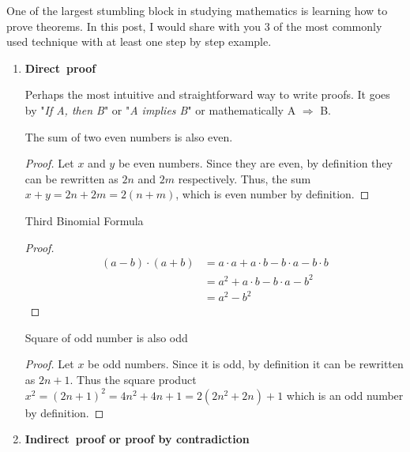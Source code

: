 \noindent One of the largest stumbling block in studying mathematics is learning how to prove theorems. In this post, I would share with you 3 of the most commonly used technique with at least one step by step example.
\newpage
\begin{enumerate}
\item \textbf{Direct proof}

\noindent Perhaps the most intuitive and straightforward way to write proofs. It goes by "\textit{If A, then B}" or  "\textit{A implies B}" or mathematically A $\Rightarrow$ B.

\begin{example}The sum of two even numbers is also even.
\begin{proof}
	Let $x$ and $y$ be even numbers. Since they are even, by definition they can be rewritten as $2n$ and $2m$ respectively. Thus, the sum $x+y = 2n+2m = 2(n+m)$, which is even number by definition.
\end{proof}
\end{example}
\begin{example}Third Binomial Formula
\begin{proof}
\begin{align}
(a-b)\cdot (a+b)&= a\cdot a+a\cdot b-b \cdot a-b \cdot b\\ 
			&= a^2+a \cdot b-b \cdot a-b^2\\ 
			&= a^2-b^2 
\end{align}
\end{proof}
\end{example}
\begin{example}Square of odd number is also odd
\begin{proof}
Let $x$ be odd numbers. Since it is odd, by definition it can be rewritten as $2n+1$. Thus the square product $x^2 = (2n+1)^2 = 4n^2+4n+1 = 2(2n^2+2n)+1$ which is an odd number by definition.
\end{proof}
\end{example}
\item \textbf{Indirect proof or proof by contradiction}


\end{enumerate}
